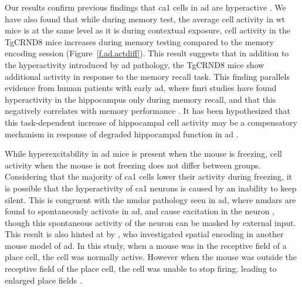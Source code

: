 Our results confirm previous findings that \gls{ca1} cells in \gls{ad} are hyperactive \citep{palop16}. We have also found that while during memory test, the average cell activity in \gls{wt} mice is at the same level as it is during contextual exposure, cell activity in the TgCRND8 mice increases during memory testing compared to the memory encoding session (Figure~\ref{f.ad.actdiff}). This result suggests that in addition to the hyperactivity introduced by \gls{ad} pathology, the TgCRND8 mice show additional activity in response to the memory recall task. This finding parallels evidence from human patients with early \gls{ad}, where \gls{fmri} studies have found hyperactivity in the hippocampus only during memory recall, and that this negatively correlates with memory performance \citep{sperling09, reiman12, kunz15}. It has been hypothesized that this task-dependent increase of hippocampal cell activity may be a compensatory mechanism in response of degraded hippocampal function in \gls{ad} \citep{kunz15}.

While hyperexcitability in \gls{ad} mice is present when the mouse is freezing, cell activity when the mouse is not freezing does not differ between groups. Considering that the majority of \gls{ca1} cells lower their activity during freezing, it is possible that the hyperactivity of \gls{ca1} neurons is caused by an inability to keep silent. This is congruent with the \gls{nmdar} pathology seen in \gls{ad}, where \glspl{nmdar} are found to spontaneously activate in \gls{ad}, and cause excitation in the neuron \citep{danysz12}, though this spontaneous activity of the neuron can be masked by external input. This result is also hinted at by \citet{cheng13}, who investigated spatial encoding in another mouse model of \gls{ad}. In this study, when a mouse was in the receptive field of a place cell, the cell was normally active. However when the mouse was outside the receptive field of the place cell, the cell was unable to stop firing, leading to enlarged place fields \citep{cheng13}. 

